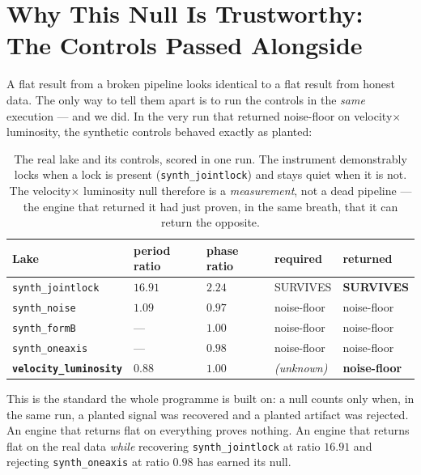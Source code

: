 \documentclass[11pt, letterpaper, openany]{book}
\begin{document}
\section{Why This Null Is Trustworthy: The Controls Passed Alongside}

A flat result from a broken pipeline looks identical to a flat result from honest data. The only
way to tell them apart is to run the controls in the \emph{same} execution --- and we did. In the
very run that returned noise-floor on velocity$\times$luminosity, the synthetic controls behaved
exactly as planted:

\begin{table}[H]
\centering
\small
\begin{tabular}{@{}lllll@{}}
\toprule
\textbf{Lake} & \textbf{period ratio} & \textbf{phase ratio} & \textbf{required} & \textbf{returned} \\
\midrule
\texttt{synth\_jointlock} & $16.91$ & $2.24$ & SURVIVES & \textbf{\color{signalgreen}SURVIVES} \\
\texttt{synth\_noise}     & $1.09$  & $0.97$ & noise-floor & \color{signalgreen}noise-floor \\
\texttt{synth\_formB}     & ---     & $1.00$ & noise-floor & \color{signalgreen}noise-floor \\
\texttt{synth\_oneaxis}   & ---     & $0.98$ & noise-floor & \color{signalgreen}noise-floor \\
\textbf{\texttt{velocity\_luminosity}} & $\mathbf{0.88}$ & $\mathbf{1.00}$ & \emph{(unknown)} & \textbf{noise-floor} \\
\bottomrule
\end{tabular}
\caption{The real lake and its controls, scored in one run. The instrument demonstrably locks when
a lock is present (\texttt{synth\_jointlock}) and stays quiet when it is not. The velocity$\times$%
luminosity null therefore is a \emph{measurement}, not a dead pipeline --- the engine that returned
it had just proven, in the same breath, that it can return the opposite.}
\end{table}

\begin{warningbox}
This is the standard the whole programme is built on: a null counts only when, in the same run, a
planted signal was recovered and a planted artifact was rejected. An engine that returns flat on
everything proves nothing. An engine that returns flat on the real data \emph{while} recovering
\texttt{synth\_jointlock} at ratio $16.91$ and rejecting \texttt{synth\_oneaxis} at ratio $0.98$
has earned its null.
\end{warningbox}
\end{document}

